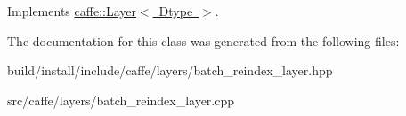 Implements \mbox{\hyperlink{classcaffe_1_1_layer_a7fe981e8af8d93d587acf2a952be563d}{caffe\+::\+Layer$<$ Dtype $>$}}.



The documentation for this class was generated from the following files\+:\begin{DoxyCompactItemize}
\item 
build/install/include/caffe/layers/batch\+\_\+reindex\+\_\+layer.\+hpp\item 
src/caffe/layers/batch\+\_\+reindex\+\_\+layer.\+cpp\end{DoxyCompactItemize}
